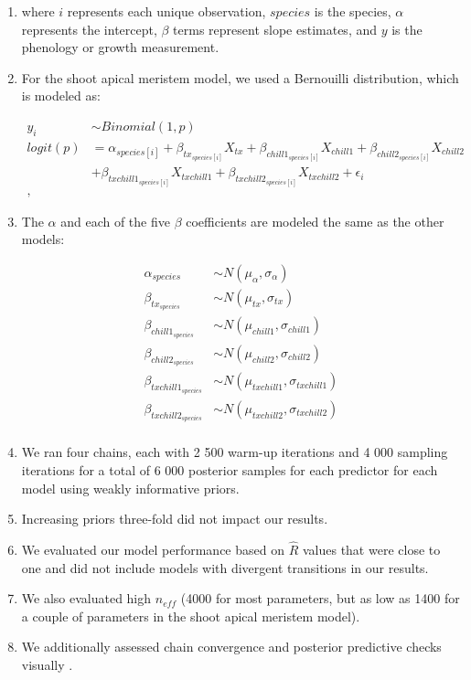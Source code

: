 \documentclass{article}\usepackage[]{graphicx}\usepackage[]{color}
\begin{document}
\begin{enumerate}
\begin{enumerate}
\item where $i$ represents each unique observation, $species$ is the species, $\alpha$ represents the intercept, $\beta$ terms represent slope estimates, and $y$ is the phenology or growth measurement. 
\item For the shoot apical meristem model, we used a Bernouilli distribution, which is modeled as:

\begin{align*}
 y_i & \sim Binomial(1,p) \tag{2} \\
logit(p) &= \alpha_{species[i]} + \beta_{tx_{species[i]}}X_{tx} + \beta_{chill1_{species[i]}}X_{chill1} + \beta_{chill2_{species[i]}}X_{chill2}\\
&+ \beta_{txchill1_{species[i]}}X_{txchill1} + \beta_{txchill2_{species[i]}}X_{txchill2} + \epsilon_i \nonumber\\,
\end{align*}

\item The $\alpha$ and each of the five $\beta$ coefficients are modeled the same as the other models:

\begin{align*}
\alpha_{species} & \sim N(\mu_{\alpha}, \sigma_{\alpha}) \\
\beta_{tx_{species}} & \sim N(\mu_{tx}, \sigma_{tx}) \\
\beta_{chill1_{species}} & \sim N(\mu_{chill1}, \sigma_{chill1}) \\
\beta_{chill2_{species}} & \sim N(\mu_{chill2}, \sigma_{chill2}) \\
\beta_{txchill1_{species}} & \sim N(\mu_{txchill1}, \sigma_{txchill1}) \\
\beta_{txchill2_{species}} & \sim N(\mu_{txchill2}, \sigma_{txchill2}) \\
\end{align*}

  \item We ran four chains, each with 2 500 warm-up iterations and 4 000 sampling iterations for a total of 6 000 posterior samples for each predictor for each model using weakly informative priors. 
  \item Increasing priors three-fold did not impact our results.
  \item We evaluated our model performance based on $\hat{R}$ values that were close to one and did not include models with divergent transitions in our results. 
  \item We also evaluated high $n_{eff}$ (4000 for most parameters, but as low as 1400 for a couple of parameters in the shoot apical meristem model). 
  \item We additionally assessed chain convergence and posterior predictive checks visually \citep{BDA}.
  \end{enumerate}
\end{enumerate}
\end{document}
